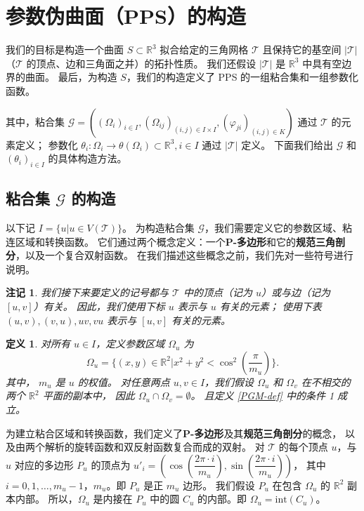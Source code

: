 \documentclass{ctexart}
\newtheorem{Def}{定义}
\newtheorem{Rmk}{注记}
\begin{document}
\section{参数伪曲面（PPS）的构造}
	我们的目标是构造一个曲面 $S\subset \mathbb{R}^3$ 拟合给定的三角网格 $\mathcal{T}$
	且保持它的基空间 $|\mathcal{T}|$ （$\mathcal{T}$ 的顶点、边和三角面之并）的拓扑性质。
	我们还假设 $|\mathcal{T}|$ 是 $\mathbb{R}^3$ 中具有空边界的曲面。
	最后，为构造 $S$，我们的构造定义了 PPS 的一组粘合集和一组参数化函数。

	其中，粘合集
	$\mathcal{G} = ((\Omega_i)_{i\in I},(\Omega_{ij})_{(i,j)\in I\times I},(\varphi_{ji})_{(i,j)\in K})$
	通过 $\mathcal{T}$ 的元素定义；
	参数化 $\theta_i:\Omega_i\rightarrow \theta(\Omega_i)\subset \mathbb{R}^3,i\in I$
	通过 $|\mathcal{T}|$ 定义。
	下面我们给出 $\mathcal{G}$ 和 $(\theta_i)_{i\in I}$ 的具体构造方法。

	\subsection{粘合集 $\mathcal{G}$ 的构造}
		以下记 $I=\{u|u \in V(\mathcal{T})\}$。
		为构造粘合集 $\mathcal{G}$，我们需要定义它的参数区域、粘连区域和转换函数。
		它们通过两个概念定义：一个\textbf{P-多边形}和它的\textbf{规范三角剖分}，以及一个复合双射函数。
		在我们描述这些概念之前，我们先对一些符号进行说明。

		\begin{Rmk}
			我们接下来要定义的记号都与 $\mathcal{T}$ 中的顶点（记为 $u$）或与边（记为 $[u,v]$）有关。
			因此，我们使用下标 $u$ 表示与 $u$ 有关的元素；
			使用下表 $(u,v),(v,u),uv,vu$ 表示与 $[u,v]$ 有关的元素。
		\end{Rmk}

		\begin{Def}\label{PD-def}
			对所有 $u\in I$，定义参数区域 $\Omega_u$ 为
			\begin{equation}
				\Omega_u=\{(x,y)\in \mathbb{R}^2|x^2+y^2<\cos^2(\dfrac{\pi}{m_u})\}.
			\end{equation}
			其中， $m_u$ 是 $u$ 的权值。
			对任意两点 $u,v\in I$，我们假设 $\Omega_u$ 和 $\Omega_v$ 在不相交的两个 $\mathbb{R}^2$ 平面的副本中，
			因此 $\Omega_u\cap \Omega_v=\emptyset$。
			且定义 \ref{PGM-def} 中的条件 1 成立。
		\end{Def}
		
		为建立粘合区域和转换函数，我们定义了\textbf{P-多边形}及其\textbf{规范三角剖分}的概念，
		以及由两个解析的旋转函数和双反射函数复合而成的双射。
		对 $\mathcal{T}$ 的每个顶点 $u$，与 $u$ 对应的多边形 $P_u$ 的顶点为
		$u'_i=(\cos(\dfrac{2\pi \cdot i}{m_u}),\sin(\dfrac{2\pi \cdot i}{m_u}))$，
		其中 $i=0,1,\dots,m_u-1$，$m_u$。即 $P_u$ 是正 $m_u$ 边形。
		我们假设 $P_u$ 在包含 $\Omega_u$ 的 $\mathbb{R}^2$ 副本内部。
		所以，$\Omega_u$ 是内接在 $P_u$ 中的圆 $C_u$ 的内部。即 $\Omega_u = \text{int}(C_u)$。
\end{document}
